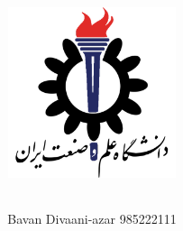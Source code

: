 \title{
    \center
    \includegraphics[width=5cm, height=5cm]{images/IUST_logo_color.png} \\
 
\CourseName 

}

\author{
  Bavan Divaani-azar 985222111 
  \\[25pt]
}
\date{\Semester}